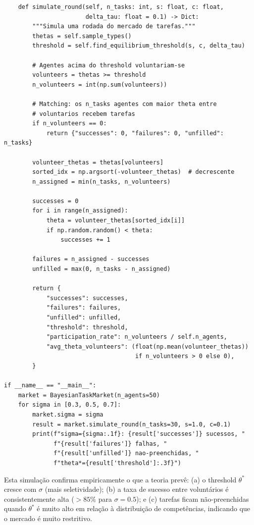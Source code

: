 \begin{verbatim}
    def simulate_round(self, n_tasks: int, s: float, c: float,
                       delta_tau: float = 0.1) -> Dict:
        """Simula uma rodada do mercado de tarefas."""
        thetas = self.sample_types()
        threshold = self.find_equilibrium_threshold(s, c, delta_tau)

        # Agentes acima do threshold voluntariam-se
        volunteers = thetas >= threshold
        n_volunteers = int(np.sum(volunteers))

        # Matching: os n_tasks agentes com maior theta entre
        # voluntarios recebem tarefas
        if n_volunteers == 0:
            return {"successes": 0, "failures": 0, "unfilled": n_tasks}

        volunteer_thetas = thetas[volunteers]
        sorted_idx = np.argsort(-volunteer_thetas)  # decrescente
        n_assigned = min(n_tasks, n_volunteers)

        successes = 0
        for i in range(n_assigned):
            theta = volunteer_thetas[sorted_idx[i]]
            if np.random.random() < theta:
                successes += 1

        failures = n_assigned - successes
        unfilled = max(0, n_tasks - n_assigned)

        return {
            "successes": successes,
            "failures": failures,
            "unfilled": unfilled,
            "threshold": threshold,
            "participation_rate": n_volunteers / self.n_agents,
            "avg_theta_volunteers": (float(np.mean(volunteer_thetas))
                                     if n_volunteers > 0 else 0),
        }

if __name__ == "__main__":
    market = BayesianTaskMarket(n_agents=50)
    for sigma in [0.3, 0.5, 0.7]:
        market.sigma = sigma
        result = market.simulate_round(n_tasks=30, s=1.0, c=0.1)
        print(f"sigma={sigma:.1f}: {result['successes']} sucessos, "
              f"{result['failures']} falhas, "
              f"{result['unfilled']} nao-preenchidas, "
              f"theta*={result['threshold']:.3f}")
\end{verbatim}

Esta simulação confirma empiricamente o que a teoria prevê: (a) o threshold $\theta^*$ cresce com $\sigma$ (mais seletividade); (b) a taxa de sucesso entre voluntários é consistentemente alta ($>85\%$ para $\sigma=0.5$); e (c) tarefas ficam não-preenchidas quando $\theta^*$ é muito alto em relação à distribuição de competências, indicando que o mercado é muito restritivo.

